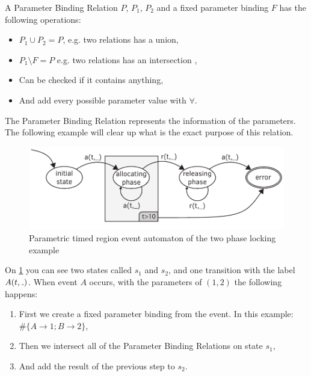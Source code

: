 
\begin{dfn}
	\label{parameter_binding_relation}
	A Parameter Binding Relation $P$, $P_1$, $P_2$ and a fixed parameter binding $F$ has the following operations:
	\begin{itemize}
		\item $P_1 \cup P_2 = P$, e.g. two relations has a union,
		\item $P_1 \setminus F = P$ e.g. two relations has an intersection ,
		\item Can be checked if it contains anything,
		\item And add every possible parameter value with $\forall$.
	\end{itemize}
\end{dfn}

The Parameter Binding Relation represents the information of the parameters.
The following example will clear up what is the exact purpose of this relation.


\begin{figure}[h]
	\centering
	\includegraphics[width=0.7\linewidth]{figures/chapter_4/allocating_timed_parametric}
	\caption{Parametric timed region event automaton of the two phase locking example \redraw}
	\label{fig:cep:ptrea2}
\end{figure}

On \cref{fig:cep:ptrea2} you can see two states called $s_1$ and $s_2$, and one transition with the label $A(t,\mathunderscore)$. When event $A$ occurs, with the parameters of $(1,2)$ the following happens:
\begin{enumerate}
	\item First we create a fixed parameter binding from the event. In this example: $\#\{A \rightarrow 1; B \rightarrow 2\}$,
	\item \label{example_step_2} Then we intersect all of the Parameter Binding Relations on state $s_1$,
	\item And add the result of the previous step %
	 to $s_2$.
\end{enumerate}
  


